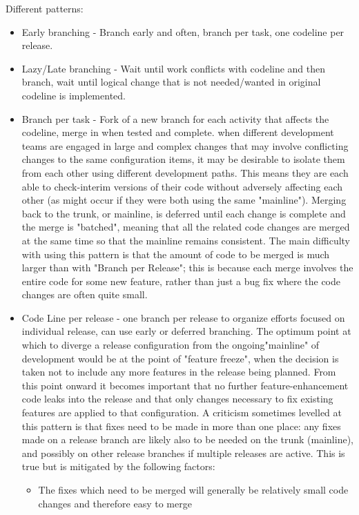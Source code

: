 Different patterns:
\begin{itemize}
    \item Early branching - Branch early and often, branch per task, one codeline per release.
    \item Lazy/Late branching - Wait until work conflicts with codeline and then branch, wait until logical change that is not needed/wanted in original codeline is implemented.
    \item Branch per task - Fork of a new branch for each activity that affects the codeline, merge in when tested and complete.
    when different development teams are engaged in large and complex changes that may involve conflicting changes to the same configuration items,
    it may be desirable to isolate them from each other using different development paths.
    This means they are each able to check-interim versions of their code without adversely affecting each other (as might occur if they were both using the same "mainline").
    Merging back to the trunk, or mainline, is deferred until each change is complete and the merge is "batched", meaning that all the related code changes are merged at the same time
    so that the mainline remains consistent.
    The main difficulty with using this pattern is that the amount of code to be merged is much larger than with "Branch per Release";
    this is because each merge involves the entire code for some new feature,
    rather than just a bug fix where the code changes are often quite small.
    \item Code Line per release - one branch per release to organize efforts focused on individual release, can use early or deferred branching.
    The optimum point at which to diverge a release configuration from the ongoing"mainline" of development would be at the point of "feature freeze",
    when the decision is taken not to include any more features in the release being planned.
    From this point onward it becomes important that no further feature-enhancement code leaks into the release and that only changes necessary
    to fix existing features are applied to that configuration.
    A criticism sometimes levelled at this pattern is that fixes need to be made in more than one place:
    any fixes made on a release branch are likely also to be needed on the trunk (mainline), and possibly on other release branches if multiple releases are active.
    This is true but is mitigated by the following factors:
    \begin{itemize}
        \item The fixes which need to be merged will generally be relatively small code changes and therefore easy to merge

\end{itemize}
\end{itemize}
